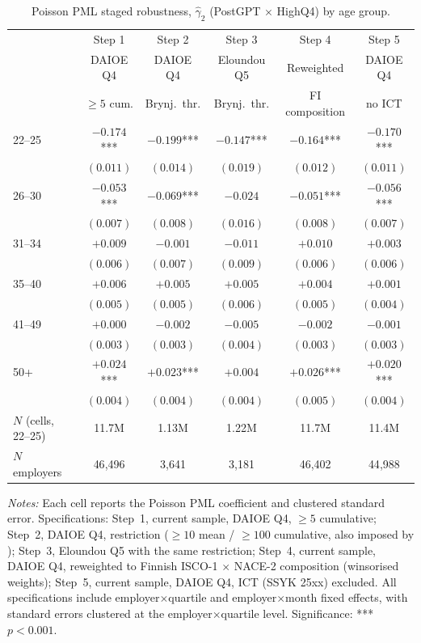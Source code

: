 \documentclass[preprint,12pt,authoryear]{elsarticle}
\begin{document}
\begin{table}[htbp]
\centering
\caption{Poisson PML staged robustness, $\hat\gamma_2$ (PostGPT $\times$ HighQ4) by age group.}
\label{tab:poisson_kauhanen}
\footnotesize
\begin{tabular}{@{}lccccc@{}}
\toprule
 & Step 1 & Step 2 & Step 3 & Step 4 & Step 5 \\
 & DAIOE Q4 & DAIOE Q4 & Eloundou Q5 & Reweighted & DAIOE Q4 \\
 & $\geq 5$ cum. & Brynj.\ thr. & Brynj.\ thr. & FI composition & no ICT \\
\midrule
22--25 & $-0.174$*** & $-0.199$*** & $-0.147$*** & $-0.164$*** & $-0.170$*** \\
       & $(0.011)$    & $(0.014)$    & $(0.019)$    & $(0.012)$    & $(0.011)$ \\
26--30 & $-0.053$*** & $-0.069$*** & $-0.024$    & $-0.051$*** & $-0.056$*** \\
       & $(0.007)$    & $(0.008)$    & $(0.016)$    & $(0.008)$    & $(0.007)$ \\
31--34 & $+0.009$     & $-0.001$     & $-0.011$     & $+0.010$     & $+0.003$ \\
       & $(0.006)$    & $(0.007)$    & $(0.009)$    & $(0.006)$    & $(0.006)$ \\
35--40 & $+0.006$     & $+0.005$     & $+0.005$     & $+0.004$     & $+0.001$ \\
       & $(0.005)$    & $(0.005)$    & $(0.006)$    & $(0.005)$    & $(0.004)$ \\
41--49 & $+0.000$     & $-0.002$     & $-0.005$     & $-0.002$     & $-0.001$ \\
       & $(0.003)$    & $(0.003)$    & $(0.004)$    & $(0.003)$    & $(0.003)$ \\
50+    & $+0.024$*** & $+0.023$*** & $+0.004$    & $+0.026$*** & $+0.020$*** \\
       & $(0.004)$    & $(0.004)$    & $(0.004)$    & $(0.005)$    & $(0.004)$ \\
\midrule
$N$ (cells, 22--25) & 11.7M & 1.13M & 1.22M & 11.7M & 11.4M \\
$N$ employers       & 46{,}496 & 3{,}641 & 3{,}181 & 46{,}402 & 44{,}988 \\
\bottomrule
\end{tabular}
\par\medskip
\noindent\parbox{\linewidth}{\raggedright\scriptsize \emph{Notes:} Each cell reports the Poisson PML coefficient and clustered standard error. Specifications: Step~1, current sample, DAIOE Q4, $\geq 5$ cumulative; Step~2, DAIOE Q4, \citet{brynjolfsson2025canaries} restriction ($\geq 10$ mean / $\geq 100$ cumulative, also imposed by \citet{kauhanen2026youth}); Step~3, Eloundou Q5 with the same restriction; Step~4, current sample, DAIOE Q4, reweighted to Finnish ISCO-1 $\times$ NACE-2 composition (winsorised weights); Step~5, current sample, DAIOE Q4, ICT (SSYK 25xx) excluded. All specifications include employer$\times$quartile and employer$\times$month fixed effects, with standard errors clustered at the employer$\times$quartile level. Significance: *** $p<0.001$.}

\end{table}
\end{document}
